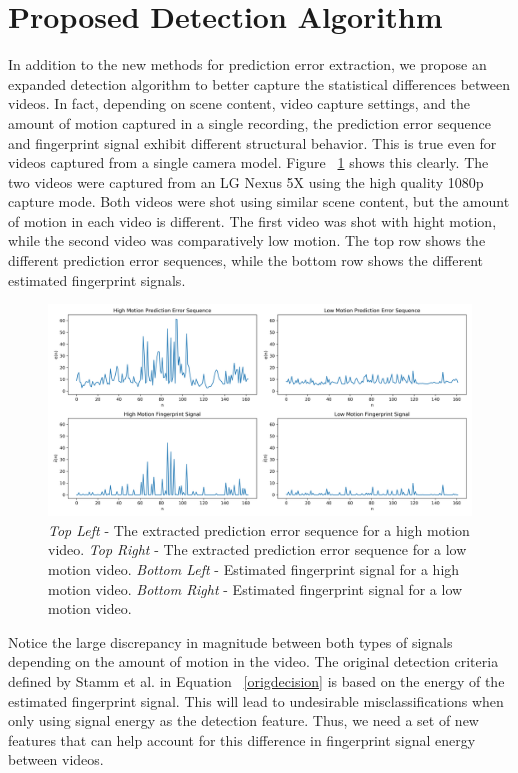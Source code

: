 \section{Proposed Detection Algorithm}

In addition to the new methods for prediction error extraction, we propose an expanded detection algorithm to better capture the statistical differences between videos. In fact, depending on scene content, video capture settings, and the amount of motion captured in a single recording, the prediction error sequence and fingerprint signal exhibit different structural behavior. This is true even for videos captured from a single camera model. Figure ~\ref{seqCompare} shows this clearly. The two videos were captured from an LG Nexus 5X using the high quality 1080p capture mode. Both videos were shot using similar scene content, but the amount of motion in each video is different. The first video was shot with hight motion, while the second video was comparatively low motion. The top row shows the different prediction error sequences, while the bottom row shows the different estimated fingerprint signals.

\begin{figure}[htbp]
\centerline{\includegraphics[width=0.9\linewidth]{ProposedApproach/perror_seq_comparisons.png}}
\caption{\emph{Top Left} - The extracted prediction error sequence for a high motion video. \emph{Top Right} - The extracted prediction error sequence for a low motion video. \emph{Bottom Left} - Estimated fingerprint signal for a high motion video. \emph{Bottom Right} - Estimated fingerprint signal for a low motion video.}
\label{seqCompare}
\end{figure}

Notice the large discrepancy in magnitude between both types of signals depending on the amount of motion in the video. The original detection criteria defined by Stamm et al. in Equation ~\ref{origdecision} is based on the energy of the estimated fingerprint signal. This will lead to undesirable misclassifications when only using signal energy as the detection feature. Thus, we need a set of new features that can help account for this difference in fingerprint signal energy between videos. 

